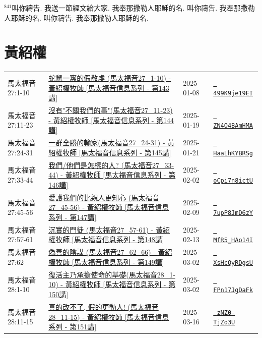 \documentclass{book}
\begin{document}
$^{841}$叫你禱告.
我送一節經文給大家.
我奉那撒勒人耶穌的名.
叫你禱告.
我奉那撒勒人耶穌的名.
叫你禱告.
我奉那撒勒人耶穌的名.
\newpage



\chapter{黃紹權}\label{ch:preacher15}
\begin{multicols}{3}
\minitoc
\end{multicols}
{ \scriptsize


\begin{xltabular}{\textwidth}{|p{0.15\textwidth} p{0.6\textwidth}|p{0.07\textwidth} p{0.1\textwidth}|}
\hline
馬太福音 27:1-10 & \hyperref[sec:499K9je19EI]{蛇鼠一窩的假敬虔 (馬太福音27\_1-10) -  黃紹權牧師 [馬太福音信息系列 - 第143講]} & 2025-01-08 & \href{https://youtube.com/watch?v=499K9je19EI}{\texttt{ 499K9je19EI}} \\
馬太福音 27:11-23 & \hyperref[sec:ZN4O4BAmHMA]{沒有"不關我們的事"(馬太福音27\_11-23) -  黃紹權牧師 [馬太福音信息系列 - 第144講]} & 2025-01-19 & \href{https://youtube.com/watch?v=ZN4O4BAmHMA}{\texttt{ ZN4O4BAmHMA}} \\
馬太福音 27:24-31 & \hyperref[sec:HaaLhKYBRSg]{一群全勝的輸家(馬太福音27\_24-31) - 黃紹權牧師  [馬太福音信息系列 - 第145講]} & 2025-01-21 & \href{https://youtube.com/watch?v=HaaLhKYBRSg}{\texttt{ HaaLhKYBRSg}} \\
馬太福音 27:33-44 & \hyperref[sec:oCpi7n8ictU]{我們/他們是怎樣的人? (馬太福音27\_33-44) - 黃紹權牧師  [馬太福音信息系列 - 第146講]} & 2025-02-02 & \href{https://youtube.com/watch?v=oCpi7n8ictU}{\texttt{ oCpi7n8ictU}} \\
馬太福音 27:45-56 & \hyperref[sec:7upP8JmD6zY]{愛護我們的比親人更知心 (馬太福音27\_45-56) - 黃紹權牧師  [馬太福音信息系列 - 第147講]} & 2025-02-09 & \href{https://youtube.com/watch?v=7upP8JmD6zY}{\texttt{ 7upP8JmD6zY}} \\
馬太福音 27:57-61 & \hyperref[sec:MfR5_HAo14I]{沉實的門徒  (馬太福音27\_57-61) - 黃紹權牧師  [馬太福音信息系列 - 第148講]} & 2025-02-13 & \href{https://youtube.com/watch?v=MfR5_HAo14I}{\texttt{ MfR5\_HAo14I}} \\
馬太福音 27:62 & \hyperref[sec:XsHcQyRDgsU]{偽善的陰謀 (馬太福音27\_62 -66) - 黃紹權牧師  [馬太福音信息系列 - 第149講]} & 2025-03-02 & \href{https://youtube.com/watch?v=XsHcQyRDgsU}{\texttt{ XsHcQyRDgsU}} \\
馬太福音 28:1-10 & \hyperref[sec:FPn17JgDaFk]{復活主乃承擔使命的基礎(馬太福音28\_1-10) - 黃紹權牧師  [馬太福音信息系列 - 第150講]} & 2025-03-02 & \href{https://youtube.com/watch?v=FPn17JgDaFk}{\texttt{ FPn17JgDaFk}} \\
馬太福音 28:11-15 & \hyperref[sec:zNZ0_TjZo3U]{真的改不了, 假的更動人! (馬太福音28\_11-15) - 黃紹權牧師  [馬太福音信息系列 - 第151講]} & 2025-03-16 & \href{https://youtube.com/watch?v=zNZ0-TjZo3U}{\texttt{ zNZ0-TjZo3U}} \\
\hline
\end{xltabular}
}
\newpage
\end{document}

